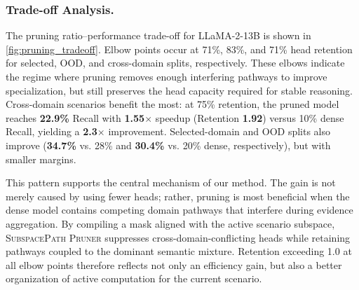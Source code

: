 
\vspace{-1mm}
\subsubsection{Trade-off Analysis.}
\vspace{-1mm}
The pruning ratio--performance trade-off for LLaMA-2-13B is shown in \cref{fig:pruning_tradeoff}. 
Elbow points occur at 71\%, 83\%, and 71\% head retention for selected, OOD, and cross-domain splits, respectively. 
These elbows indicate the regime where pruning removes enough interfering pathways to improve specialization, but still preserves the head capacity required for stable reasoning. 
Cross-domain scenarios benefit the most: at 75\% retention, the pruned model reaches \textbf{22.9\%} Recall with \textbf{1.55$\times$} speedup (Retention \textbf{1.92}) versus 10\% dense Recall, yielding a \textbf{2.3$\times$} improvement. 
Selected-domain and OOD splits also improve (\textbf{34.7\%} vs. 28\% and \textbf{30.4\%} vs. 20\% dense, respectively), but with smaller margins.

This pattern supports the central mechanism of our method. 
The gain is not merely caused by using fewer heads; rather, pruning is most beneficial when the dense model contains competing domain pathways that interfere during evidence aggregation. 
By compiling a mask aligned with the active scenario subspace, \textsc{SubspacePath Pruner} suppresses cross-domain-conflicting heads while retaining pathways coupled to the dominant semantic mixture. 
Retention exceeding 1.0 at all elbow points therefore reflects not only an efficiency gain, but also a better organization of active computation for the current scenario.


